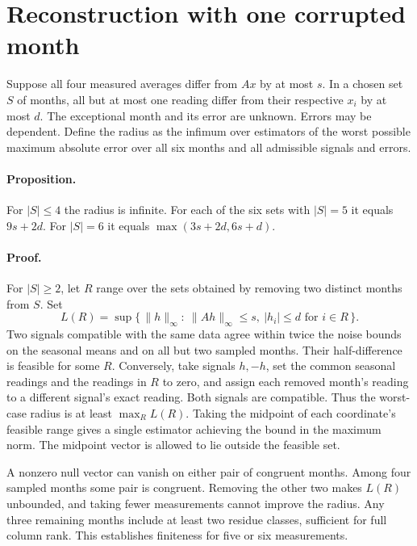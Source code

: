 \documentclass[11pt]{article}
\begin{document}
\section{Reconstruction with one corrupted month}
Suppose all four measured averages differ from $Ax$ by at most $s$. In a chosen set $S$ of months, all but at most one reading differ from their respective $x_i$ by at most $d$. The exceptional month and its error are unknown. Errors may be dependent. Define the radius as the infimum over estimators of the worst possible maximum absolute error over all six months and all admissible signals and errors.

\paragraph{Proposition.} For $|S|\leq4$ the radius is infinite. For each of the six sets with $|S|=5$ it equals $9s+2d$. For $|S|=6$ it equals $\max(3s+2d,6s+d)$.

\paragraph{Proof.} For $|S|\geq2$, let $R$ range over the sets obtained by removing two distinct months from $S$. Set
\[
 L(R)=\sup\{\,\|h\|_\infty:\ \|Ah\|_\infty\leq s,\ |h_i|\leq d\text{ for }i\in R\,\}.
\]
Two signals compatible with the same data agree within twice the noise bounds on the seasonal means and on all but two sampled months. Their half-difference is feasible for some $R$. Conversely, take signals $h,-h$, set the common seasonal readings and the readings in $R$ to zero, and assign each removed month's reading to a different signal's exact reading. Both signals are compatible. Thus the worst-case radius is at least $\max_R L(R)$. Taking the midpoint of each coordinate's feasible range gives a single estimator achieving the bound in the maximum norm. The midpoint vector is allowed to lie outside the feasible set.

A nonzero null vector can vanish on either pair of congruent months. Among four sampled months some pair is congruent. Removing the other two makes $L(R)$ unbounded, and taking fewer measurements cannot improve the radius. Any three remaining months include at least two residue classes, sufficient for full column rank. This establishes finiteness for five or six measurements.
\end{document}
